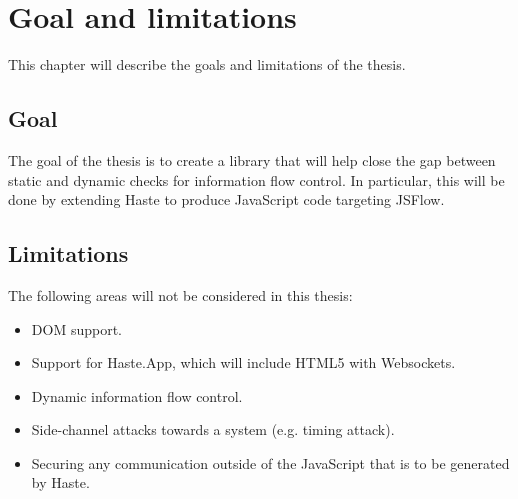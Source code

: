 \chapter{Goal and limitations}
This chapter will describe the goals and limitations of the thesis.

\section{Goal}
The goal of the thesis is to create a library that will help close the gap between static and dynamic checks for information flow control. In particular, this will be done by extending Haste to produce JavaScript code targeting JSFlow.

\section{Limitations}
The following areas will not be considered in this thesis:
\begin{itemize}
  \item DOM support.
  \item Support for Haste.App, which will include HTML5 with Websockets.
  \item Dynamic information flow control.
  \item Side-channel attacks towards a system (e.g. timing attack).
  \item Securing any communication outside of the JavaScript that is to be generated by Haste.
\end{itemize}

